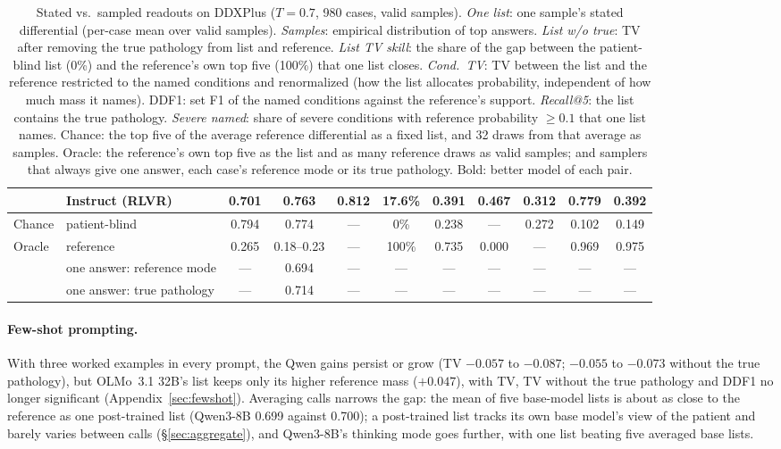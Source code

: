 \documentclass[11pt]{article}
\begin{document}
\begin{table}[t]
\begin{adjustbox}{max width=\linewidth}
\begin{tabular}{llccccccccc}
 & Instruct (RLVR) & \textbf{0.701} & 0.763 & \textbf{0.812} & 17.6\% & \textbf{0.391} & \textbf{0.467} & \textbf{0.312} & \textbf{0.779} & \textbf{0.392} \\
\midrule
Chance & patient-blind & 0.794 & 0.774 & --- & 0\% & 0.238 & --- & 0.272 & 0.102 & 0.149 \\
Oracle & reference & 0.265 & 0.18--0.23 & --- & 100\% & 0.735 & 0.000 & --- & 0.969 & 0.975 \\
 & one answer: reference mode & --- & 0.694 & --- & --- & --- & --- & --- & --- & --- \\
 & one answer: true pathology & --- & 0.714 & --- & --- & --- & --- & --- & --- & --- \\
\bottomrule
\end{tabular}
\end{adjustbox}
\caption{Stated vs.\ sampled readouts on DDXPlus ($T{=}0.7$, 980 cases, valid samples). \emph{One list}: one sample's stated differential (per-case mean over valid samples). \emph{Samples}: empirical distribution of top answers. \emph{List w/o true}: TV after removing the true pathology from list and reference. \emph{List TV skill}: the share of the gap between the patient-blind list (0\%) and the reference's own top five (100\%) that one list closes. \emph{Cond.\ TV}: TV between the list and the reference restricted to the named conditions and renormalized (how the list allocates probability, independent of how much mass it names). DDF1: set F1 of the named conditions against the reference's support. \emph{Recall@5}: the list contains the true pathology. \emph{Severe named}: share of severe conditions with reference probability $\geq 0.1$ that one list names. Chance: the top five of the average reference differential as a fixed list, and 32 draws from that average as samples. Oracle: the reference's own top five as the list and as many reference draws as valid samples; and samplers that always give one answer, each case's reference mode or its true pathology. Bold: better model of each pair.}
\label{tab:stated}
\end{table}

\paragraph{Few-shot prompting.}With three worked examples in every prompt, the Qwen gains persist or grow (TV $-0.057$ to $-0.087$; $-0.055$ to $-0.073$ without the true pathology), but OLMo~3.1 32B's list keeps only its higher reference mass ($+0.047$), with TV, TV without the true pathology and DDF1 no longer significant (Appendix~\ref{sec:fewshot}). Averaging calls narrows the gap: the mean of five base-model lists is about as close to the reference as one post-trained list (Qwen3-8B 0.699 against 0.700); a post-trained list tracks its own base model's view of the patient and barely varies between calls (\S\ref{sec:aggregate}), and Qwen3-8B's thinking mode goes further, with one list beating five averaged base lists.
\end{document}

